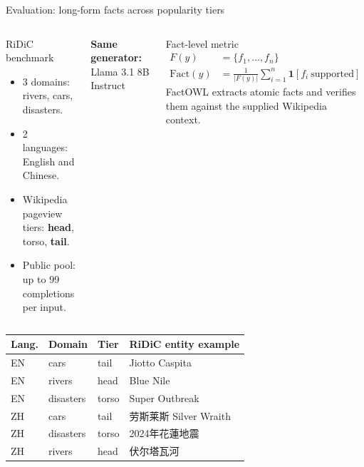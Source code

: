 \documentclass[aspectratio=169,10pt]{beamer}
\newcommand{\FactOWL}{\textsf{FactOWL}}
\newcommand{\RiDiC}{\textsf{RiDiC}}
\begin{document}
\begin{frame}{Evaluation: long-form facts across popularity tiers}
  \begin{columns}[T,onlytextwidth]
      \begin{block}{\RiDiC{} benchmark}
        \begin{itemize}
          \item 3 domains: rivers, cars, disasters.
          \item 2 languages: English and Chinese.
          \item Wikipedia pageview tiers: \textbf{head}, torso, \textbf{tail}.
          \item Public pool: up to 99 completions per input.
        \end{itemize}
      \end{block}
      \vspace{4pt}
      \centering
      \textbf{Same generator:} Llama 3.1 8B Instruct
      \begin{block}{Fact-level metric}
        \begin{align*}
          F(y) &= \{f_1,\ldots,f_n\}\\[-2pt]
          \mathrm{Fact}(y) &= \frac{1}{|F(y)|}\sum_{i=1}^{n}\mathbf{1}[f_i\ \text{supported}]
        \end{align*}
        \small
        \FactOWL{} extracts atomic facts and verifies them against the supplied Wikipedia context.
      \end{block}
  \end{columns}
  \vspace{0pt}
  \begin{center}
    \color{ink}
    \footnotesize
    \renewcommand{\arraystretch}{0.75}
    \begin{tabular}{@{}llll@{}}
      \toprule
      \textbf{Lang.} & \textbf{Domain} & \textbf{Tier} & \textbf{RiDiC entity example}\\
      \midrule
      EN & cars      & tail  & Jiotto Caspita\\
      EN & rivers    & head  & Blue Nile\\
      EN & disasters & torso & Super Outbreak\\
      ZH & cars      & tail  & 劳斯莱斯 Silver Wraith\\
      ZH & disasters & torso & 2024年花蓮地震\\
      ZH & rivers    & head  & 伏尔塔瓦河\\
      \bottomrule
    \end{tabular}
  \end{center}
\end{frame}
\end{document}
